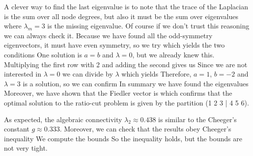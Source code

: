 A clever way to find the last eigenvalue is to note that the trace of the Laplacian is the sum over all node degrees, 
but also it must be the sum over eigenvalues
where $\lambda_m=3$ is the missing eigenvalue. Of course if we don't trust this reasoning we can always check it. Because we have found all the odd-symmetry eigenvectors, it must have even symmetry, so we try 
which yields the two conditions
One solution is $a=b$ and $\lambda=0$, but we already knew this. Multiplying the first row with 2 and adding the second gives us 
Since we are not interested in $\lambda=0$ we can divide by $\lambda$ which yields 
Therefore, $a=1$, $b=-2$ and $\lambda=3$ is a solution, so we can confirm 
In summary we have found the eigenvalues 
Moreover, we have shown that the Fiedler vector is 
which confirms that the optimal solution to the ratio-cut problem is given by the partition (1 2 3 | 4 5 6).  

As expected, the algebraic connectivity $\lambda_2 \approx  0.438$ is similar to the Cheeger's constant $g\approx 0.333$. Moreover, we can check that the results obey Cheeger's inequality
We compute the bounds
So the inequality holds, 
but the bounds are not very tight. 
